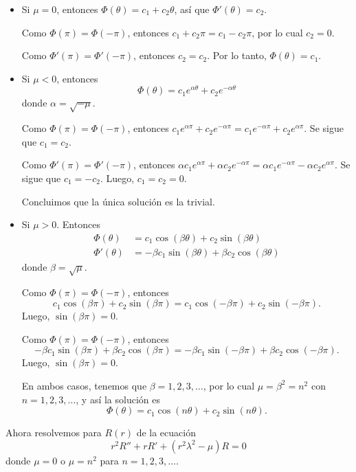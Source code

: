\documentclass[11pt,letterpaper]{report}
\newcommand\<{\langle}
\renewcommand\>{\rangle}
\begin{document}
\begin{itemize}
  \item
    Si $\mu=0$, entonces $\Phi(\theta)=c_1+c_2\theta$, así que
    $\Phi'(\theta)=c_2$.

    Como $\Phi(\pi)=\Phi(-\pi)$, entonces $c_1+c_2\pi=c_1-c_2\pi$,
    por lo cual $c_2=0$.
    
    Como $\Phi'(\pi)=\Phi'(-\pi)$, entonces $c_2=c_2$. Por
    lo tanto, $\Phi(\theta)=c_1$.
  
  \item
    Si $\mu<0$, entonces
    \[
       \Phi(\theta)
       =c_1e^{\alpha\theta}+
       c_2e^{-\alpha\theta}
    \]
    donde $\alpha=\sqrt{-\mu}$.

    Como $\Phi(\pi)=\Phi(-\pi)$, entonces
    $c_1e^{\alpha\pi}+c_2e^{-\alpha\pi}
    =c_1e^{-\alpha\pi}+c_2e^{\alpha\pi}$. Se sigue que
    $c_1=c_2$.

    Como $\Phi'(\pi)=\Phi'(-\pi)$, entonces
    $\alpha c_1e^{\alpha\pi}+\alpha c_2e^{-\alpha\pi}
    = \alpha c_1e^{-\alpha\pi}-\alpha c_2e^{\alpha\pi}$. Se
    sigue que $c_1=-c_2$. Luego, $c_1=c_2=0$.
    
    Concluimos que la única solución es la trivial.

  \item
    Si $\mu>0$. Entonces
    \begin{align*}
      \Phi(\theta) &=
      c_1\cos(\beta\theta)+c_2\sin(\beta\theta) \\
      \Phi'(\theta) &=
      -\beta c_1\sin(\beta\theta)+\beta c_2\cos(\beta\theta)
    \end{align*}
    donde $\beta=\sqrt\mu$.
    
    Como $\Phi(\pi)=\Phi(-\pi)$, entonces
    \[
      c_1\cos(\beta\pi)+c_2\sin(\beta\pi)
      =
      c_1\cos(-\beta\pi)+c_2\sin(-\beta\pi)
    .\]
    Luego, $\sin(\beta\pi)=0$.

    Como $\Phi(\pi)=\Phi(-\pi)$, entonces
    \[
      -\beta c_1\sin(\beta\pi)+\beta c_2\cos(\beta\pi)
      =
      -\beta c_1\sin(-\beta\pi)+\beta c_2\cos(-\beta\pi)
    .\]
    Luego, $\sin(\beta\pi)=0$.

    En ambos casos, tenemos que $\beta=1,2,3,\dots$, por lo
    cual $\mu=\beta^{2}=n^{2}$ con $n=1,2,3,\dots$, y así la solución es
    \[
      \Phi(\theta) = c_1\cos(n\theta) + c_2\sin(n\theta).
    \] 
    
\end{itemize}

\noindent Ahora resolvemos para $R(r)$ de la ecuación
\[
  r^{2}R'' +rR' +(r^{2}\lambda^{2}-\mu)R = 0
\]
donde $\mu=0$ o $\mu=n^{2}$ para $n=1,2,3,\dots$.
\end{document}
